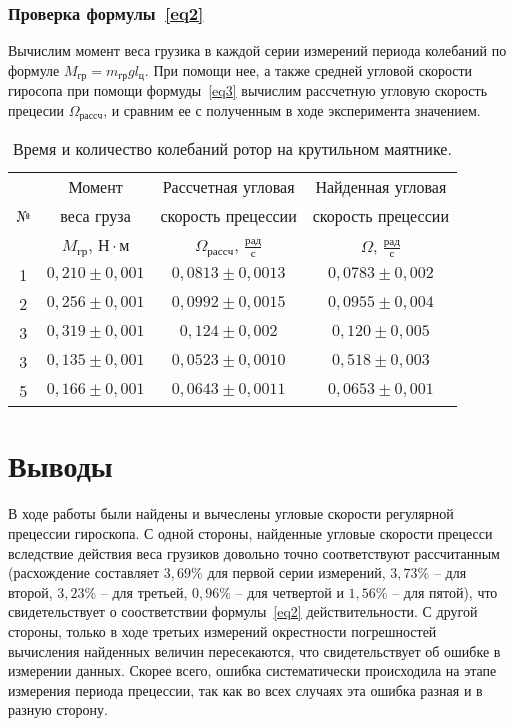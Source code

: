\documentclass[a4paper,11pt]{article}
\begin{document}
\subsubsection{Проверка формулы~\ref{eq2}} %
Вычислим момент веса грузика в каждой серии измерений периода колебаний по формуле $M_{гр} = m_{гр}g l_{ц}$. При помощи нее, а также средней угловой скорости гиросопа при помощи формуды~\ref{eq3} вычислим рассчетную угловую скорость прецесии $\Omega_{рассч}$, и сравним ее с полученным в ходе эксперимента значением.
\begin{table}[h!]
\centering
\begin{tabular}{ ||c|c|c|c|| }
  \hline
   & Момент & Рассчетная угловая & Найденная угловая \\
  № & веса груза & скорость прецессии & скорость прецессии \\
   & $M_{гр}$, $Н \cdot м$ & $\Omega_{рассч}$, $\frac{рад}{с}$ & $\Omega$, $\frac{рад}{с}$ \\
  \hline
  1 & $0,210 \pm 0,001$ & $0,0813 \pm 0,0013$ & $0,0783 \pm 0,002$ \\
  2 & $0,256 \pm 0,001$ & $0,0992 \pm 0,0015$ & $0,0955 \pm 0,004$ \\
  3 & $0,319 \pm 0,001$ &  $0,124 \pm 0,002$  & $0,120 \pm 0,005$ \\
  3 & $0,135 \pm 0,001$ & $0,0523 \pm 0,0010$ & $0,518 \pm 0,003$ \\
  5 & $0,166 \pm 0,001$ & $0,0643 \pm 0,0011$ & $0,0653 \pm 0,001$ \\
  \hline
\end{tabular}
\caption{Время и количество колебаний ротор на крутильном маятнике.}
\label{table:tab7}
\end{table}\newline
\section{Выводы}
В ходе работы были найдены и вычеслены угловые скорости регулярной прецессии гироскопа.\newline
С одной стороны, найденные угловые скорости прецесси вследствие действия веса грузиков довольно точно соответствуют рассчитанным (расхождение составляет $3,69 \%$ для первой серии измерений, $3,73 \%$ -- для второй, $3,23 \%$ -- для третьей, $0,96 \%$ -- для четвертой и $1,56 \%$ -- для пятой), что свидетельствует о соостветствии формулы~\ref{eq2} действительности. С другой стороны, только в ходе третьих измерений окрестности погрешностей вычисления найденных величин пересекаются, что свидетельствует об ошибке в измерении данных. Скорее всего, ошибка систематически происходила на этапе измерения периода прецессии, так как во всех случаях эта ошибка разная и в разную сторону.
\end{document}
